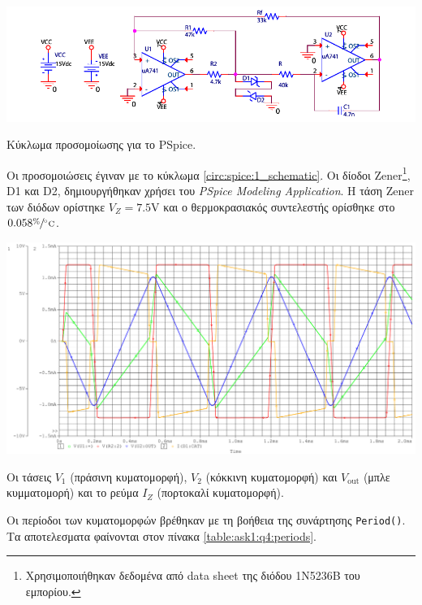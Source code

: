 \begin{center}
	\begin{circuitfig}[H]
		\includegraphics[width=15cm]{spice_01/schematic.pdf}
		\caption{Κύκλωμα προσομοίωσης για το PSpice.}
		\label{circ:spice:1_schematic}
	\end{circuitfig}
\end{center}

Οι προσομοιώσεις έγιναν με το κύκλωμα \ref{circ:spice:1_schematic}. Οι δίοδοι Zener\footnote{Χρησιμοποιήθηκαν δεδομένα από data sheet της διόδου 1N5236B του εμπορίου.}, D1 και D2, δημιουργήθηκαν χρήσει του \textsl{PSpice Modeling Application}. Η τάση Zener των διόδων ορίστηκε $V_Z=7.5\unit{\volt}$ και ο θερμοκρασιακός συντελεστής ορίσθηκε στο $0.058\displaystyle{\sfrac{\%}{\unit{\celsius}}}$.


\begin{chart}[H]
	\begin{center}
		\includegraphics[width=15cm]{spice_01/q4cropped.pdf}
		\caption{Οι τάσεις $V_1$ (πράσινη κυματομορφή), $V_2$ (κόκκινη κυματομορφή) και $V_{\mathrm{out}}$ (μπλε κυμματομορή) και το ρεύμα $I_Z$ (πορτοκαλί κυματομορφή).}
		\label{plot:ask1:q4}
	\end{center}
\end{chart}

Οι περίοδοι των κυματομορφών βρέθηκαν με τη βοήθεια της συνάρτησης \texttt{Period()}. Τα αποτελεσματα φαίνονται στον πίνακα \ref{table:ask1:q4:periods}.

